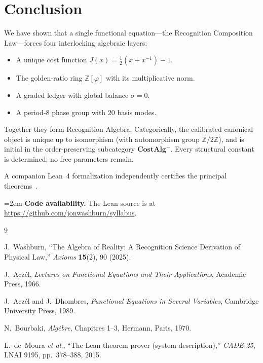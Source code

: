 \documentclass[11pt,a4paper]{article}
\theoremstyle{plain}
\theoremstyle{definition}
\theoremstyle{remark}
\newcommand{\phig}{\varphi}
\newcommand{\Jcost}{J}
\newcommand{\ZZ}{\mathbb{Z}}
\begin{document}
\section{Conclusion}\label{sec:conclusion}

We have shown that a single functional equation---the Recognition
Composition Law---forces four interlocking algebraic layers:
\begin{itemize}[nosep]
\item A unique cost function $\Jcost(x)=\frac12(x+x^{-1})-1$.
\item The golden-ratio ring $\ZZ[\phig]$ with its multiplicative norm.
\item A graded ledger with global balance $\sigma=0$.
\item A period-8 phase group with 20 basis modes.
\end{itemize}
Together they form Recognition Algebra.  Categorically, the calibrated
canonical object is unique up to isomorphism (with automorphism group
$\ZZ/2\ZZ$), and is initial in the order-preserving subcategory
$\mathbf{CostAlg}^{+}$.  Every structural constant is determined; no
free parameters remain.

A companion Lean~4 formalization independently certifies the principal
theorems~\cite{lean2015}.

\begingroup\emergencystretch=2em
\noindent\textbf{Code availability.}
The Lean source is at \url{https://github.com/jonwashburn/syllabus}.
\endgroup

\begin{thebibliography}{9}

J.~Washburn,
``The Algebra of Reality: A Recognition Science Derivation of Physical Law,''
\emph{Axioms} \textbf{15}(2), 90 (2025).

J.~Acz\'{e}l,
\emph{Lectures on Functional Equations and Their Applications},
Academic Press, 1966.

J.~Acz\'{e}l and J.~Dhombres,
\emph{Functional Equations in Several Variables},
Cambridge University Press, 1989.

N.~Bourbaki,
\emph{Alg\`ebre}, Chapitres 1--3,
Hermann, Paris, 1970.

L.~de~Moura \emph{et al.},
``The Lean theorem prover (system description),''
\emph{CADE-25}, LNAI 9195, pp.~378--388, 2015.

\end{thebibliography}
\end{document}
